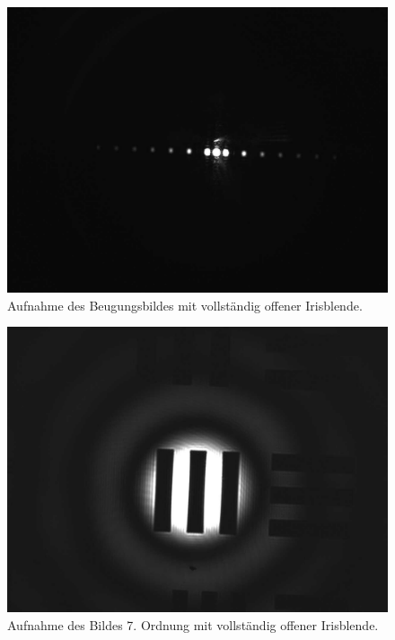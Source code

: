 \documentclass{article}
\begin{document}
\begin{minipage}[t]{.45\textwidth}
\begin{figure}[H]
\includegraphics[scale=0.1]{tm/Beugungsbild_voll.jpg}
\caption{Aufnahme des Beugungsbildes mit vollständig offener Irisblende.}
\label{fig:bbild_voll_tm}
\end{figure}
\end{minipage}
\hfill
\noindent
\begin{minipage}[t]{.45\textwidth}
\begin{figure}[H]
\includegraphics[scale=0.1]{tm/Bild_voll.jpg}
\caption{Aufnahme des Bildes 7. Ordnung mit vollständig offener Irisblende.}\label{fig:bild_voll_tm}
\end{figure}
\end{minipage}
\end{document}
